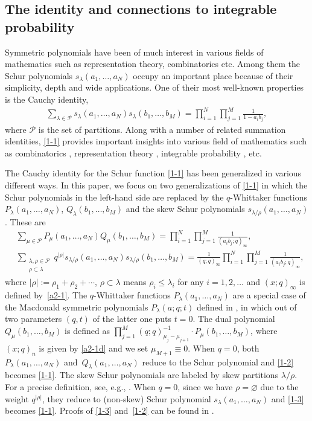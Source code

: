 \documentclass[pdftex]{sigma}
\numberwithin{equation}{section}
\def\i{\infty}
\def\l{\lambda}
\def\Pe{\mathcal{P}}
\begin{document}
\subsection{The identity and connections to integrable probability}
 Symmetric polynomials have been of much interest in various fields of mathematics such as representation theory, combinatorics etc. Among them the Schur polynomials $s_{\l}(a_1,\dots,a_N)$ occupy an important place because of their simplicity, depth and wide applications. One of their most well-known properties
 is the Cauchy identity,
\begin{align}
\label{1-1}
 \sum_{\l\in\Pe}s_{\l}(a_1,\dots,a_N)s_{\l}(b_1,\dots,b_M)
 =
 \prod_{i=1}^N\prod_{j=1}^M\frac{1}{1-a_ib_j},
\end{align}
 where $\Pe$ is the set of partitions.
 Along with a number of related summation identities, \eqref{1-1} provides important insights into various field of mathematics such as combinatorics \cite{Sagan2000symmetricgroup}, representation theory \cite{Bump2013Liegroups}, integrable probability \cite{BorodinGorin2016IntegrableProbability}, etc.

 The Cauchy identity for the Schur function \eqref{1-1} has been generalized in various different ways. In this paper, we focus on two generalizations of \eqref{1-1} in which the Schur polynomials in the left-hand side are replaced by the $q$-Whittaker functions $P_{\l}(a_1,\dots,a_N)$, $Q_{\l}(b_1,\dots,b_M)$ and the skew Schur polynomials $s_{\l/\rho}(a_1,\dots,a_N)$. These are
 \begin{align}
 \label{1-3}
 &\sum_{\mu\in\Pe}P_{\mu}(a_1,\dots,a_N)
 Q_{\mu}(b_1,\dots,b_M)
 =
 \prod_{i=1}^N\prod_{j=1}^M\frac{1}{(a_ib_j;q)_{\i}},
 \\
 \label{1-2}
 &\sum_{\substack{\l,\rho\in\Pe\\
 \rho\subset \l
 }}q^{|\rho|}s_{\l/\rho}(a_1,\dots,a_N)s_{\l/\rho}(b_1,\dots,b_M)
 =
 \frac{1}{(q;q)_\i}
 \prod_{i=1}^N\prod_{j=1}^M\frac{1}{(a_ib_j;q)_{\i}},
 \end{align}
 where $|\rho|:=\rho_1+\rho_2+\cdots$, $\rho\subset\l$ means $\rho_i\le \l_i$ for any $i=1,2,\dots$ and $(x;q)_{\i}$ is defined by~\eqref{a2-1}. The $q$-Whittaker functions $P_{\l}(a_1,\dots,a_N)$ are a special case of the Macdonald symmetric polynomials $P_{\l}(a;q;t)$ defined in \cite[Chapter~VI]{macdonald1998symmetric}, in which out of two parameters $(q,t)$ of the latter one puts $t=0$. The dual polynomial $Q_{\mu}(b_1,\dots,b_M)$ is defined as
 $
 \prod_{j=1}^M (q;q)_{\mu_j-\mu_{j+1}}^{-1}\cdot P_{\mu}(b_1,\dots,b_M)$,
 where $(x;q)_n$ is given by \eqref{a2-1d} and we set $\mu_{M+1}\equiv 0$. When $q=0$, both $P_{\l}(a_1,\dots,a_N)$ and~${Q_{\l}(a_1,\dots,a_N)}$ reduce to the Schur polynomial and \eqref{1-2} becomes \eqref{1-1}. The skew Schur polynomials \smash{$s_{\l/\rho}(a_1,\dots,a_N)$} are labeled by skew partitions $\l/\rho$. For a precise definition, see, e.g., \cite[Chapter~I]{macdonald1998symmetric}. When $q=0$, since we have $\rho=\varnothing$ due to the weight $q^{|\rho|}$, they reduce to (non-skew) Schur polynomial $s_{\l}(a_1,\dots,a_N)$ and \eqref{1-3} becomes \eqref{1-1}. Proofs of \eqref{1-3} and~\eqref{1-2} can be found in \cite[Sections~VI.4 and~I.5.28\,(a)]{macdonald1998symmetric}.
\end{document}
